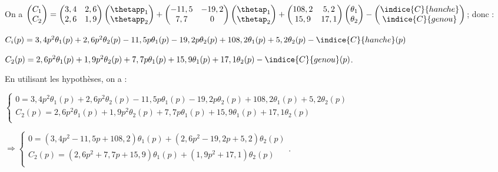 \documentclass[11pt]{article}
\begin{document}
\begin{UPSTIcorrige}
On a $
\begin{pmatrix}
C_1 \\
C_2
\end{pmatrix}
=\begin{pmatrix}
3,4 & 2,6 \\
2,6 & 1,9
\end{pmatrix} \begin{pmatrix}
\thetapp_1 \\
\thetapp_2
\end{pmatrix}
+
\begin{pmatrix}
-11,5 & -19,2 \\
7,7 & 0
\end{pmatrix} \begin{pmatrix}
\thetap_1 \\
\thetap_2
\end{pmatrix}
+
\begin{pmatrix}
108,2 & 5,2 \\
15,9 & 17,1
\end{pmatrix} 
\begin{pmatrix}
\theta_1 \\
\theta_2
\end{pmatrix}-
\begin{pmatrix}
\indice{C}{hanche} \\
\indice{C}{genou}
\end{pmatrix}
$; donc : 

$C_i(p) = 3,4 p^2 \theta_1(p) + 2,6p^2\theta_2(p) - 11,5 p\theta_1(p) - 19,2p\theta_2(p) + 108,2\theta_1(p) + 5,2\theta_2(p) - \indice{C}{hanche}(p)$

$C_2(p) = 2,6 p^2 \theta_1(p) + 1,9 p^2\theta_2(p) + 7,7 p\theta_1(p) + 15,9\theta_1(p) + 17,1\theta_2(p) - \indice{C}{genou}(p)$.

En utilisant les hypothèses, on a :

$\left\{
\begin{array}{l} 
0= 3,4 p^2 \theta_1(p) + 2,6p^2\theta_2(p) - 11,5 p\theta_1(p) - 19,2p\theta_2(p) + 108,2\theta_1(p) + 5,2\theta_2(p) \\
C_2(p) = 2,6 p^2 \theta_1(p) + 1,9 p^2\theta_2(p) + 7,7 p\theta_1(p) + 15,9\theta_1(p) + 17,1\theta_2(p) \\
\end{array}
\right.$

$\Rightarrow \left\{
\begin{array}{l} 
0= \left(3,4 p^2 - 11,5 p + 108,2\right) \theta_1(p) + \left(2,6p^2 - 19,2p + 5,2\right)\theta_2(p) \\
C_2(p) = \left( 2,6 p^2 + 7,7 p + 15,9\right)\theta_1(p) + \left( 1,9 p^2+ 17,1\right)\theta_2(p) \\
\end{array}
\right.$.


\end{UPSTIcorrige}
\end{document}
